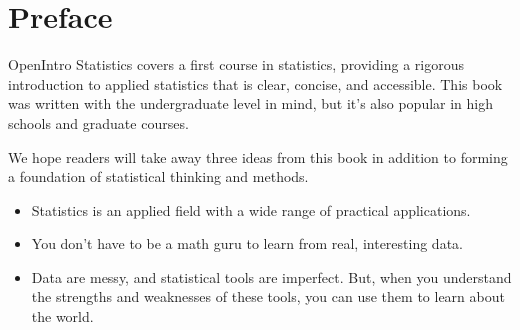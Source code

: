 \chapter*{Preface}

\noindent%
OpenIntro Statistics covers a first course in statistics,
providing a rigorous introduction to applied statistics
that is clear, concise, and accessible.
This book was written with the undergraduate level in mind,
but it's also popular in high schools and graduate courses.
\vspace{3mm}

We hope readers will take away three ideas from
this book in addition to forming a foundation of statistical
thinking and methods.\vspace{-1mm}
\begin{itemize}
\setlength{\itemsep}{0mm}
\item
    Statistics is an applied field with a wide range
    of practical applications.
\item
    You don't have to be a math guru to learn
    from real, interesting data.
\item
    Data are messy, and statistical tools are imperfect.
    But, when you understand the strengths and weaknesses of
    these tools, you can use them to learn about the world.
\end{itemize}


%
%
%


